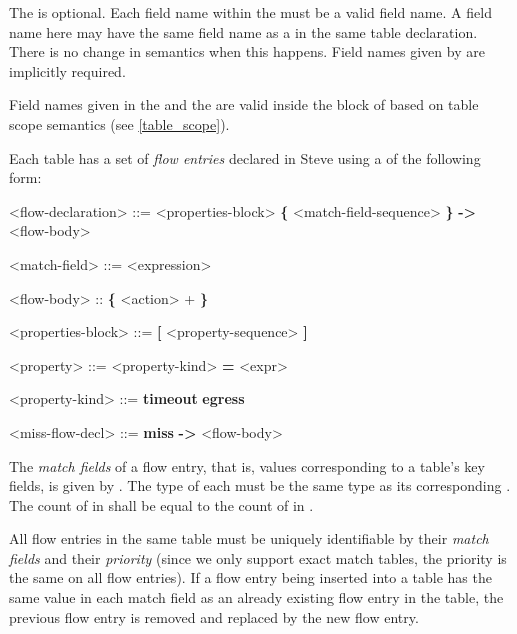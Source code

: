 The  is optional. Each field name within the  must be a valid field name. A field name here may have the same field name as a  in the same table declaration. There is no change in semantics when this happens. Field names given by  are implicitly required.

Field names given in the  and the  are valid inside the block of  based on table scope semantics (see \ref{table_scope}).

Each table has a set of \textit{flow entries} declared in Steve using a  of the following form:

\begin{minip}
\begin{grammar}
<flow-declaration> ::=
<properties-block>
\textbf{\{} <match-field-sequence> \textbf{\}} \textbf{-\textgreater} <flow-body>

<match-field> ::= <expression>

<flow-body> :: \textbf{\{} <action> + \textbf{\}}

<properties-block> ::=
\textbf{[} <property-sequence> \textbf{]}

<property> ::=
<property-kind> \textbf{=} <expr>

<property-kind> ::=
\textbf{timeout}
\alt \textbf{egress}

<miss-flow-decl> ::=
\textbf{miss} \textbf{-\textgreater} <flow-body>
\end{grammar}
\end{minip}

The \textit{match fields} of a flow entry, that is, values corresponding to a table's key fields, is given by . The type of each  must be the same type as its corresponding . The count of  in  shall be equal to the count of  in .

All flow entries in the same table must be uniquely identifiable by their \textit{match fields} and their \textit{priority} (since we only support exact match tables, the priority is the same on all flow entries). If a flow entry being inserted into a table has the same value in each match field as an already existing flow entry in the table, the previous flow entry is removed and replaced by the new flow entry.

